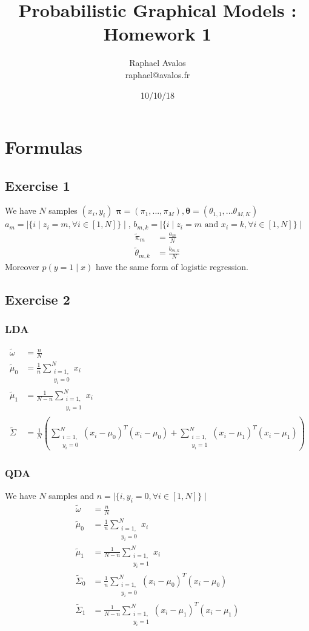 \documentclass[a4paper]{article}
\title{Probabilistic Graphical Models : Homework 1}
\author{Raphael Avalos\\raphael@avalos.fr}
\date{10/10/18}
\begin{document}
\maketitle
\section{Formulas}
\subsection{Exercise 1}
We have $N$ samples $(x_i,y_i)$
$\pmb{\pi} = (\pi_1, ..., \pi_M), \pmb{\theta} = (\theta_{1,1}, ... \theta_{M,K})$	\\
$a_m = \mid \{ i \mid  z_i = m, \forall i \in [1,N]\}\mid $, $b_{m,k} = \mid \{ i \mid  z_i = m \text{ and } x_i = k, \forall i \in [1,N]\}\mid $
\begin{align*}
\tilde{\pi}_m &= \frac{a_m}{N} \\
\tilde{\theta}_{m,k} &= \frac{b_{m,k}}{N}
\end{align*}
Moreover $p(y=1 \mid x)$ have the same form of logistic regression.
\subsection{Exercise 2}
\subsubsection{LDA}
\begin{align*}
\tilde{\omega} &= \frac{n}{N} \\
\tilde{\mu}_0 &= \frac{1}{n} \sum_{\substack{i=1,\\ y_i=0}}^N x_i \\
\tilde{\mu}_1 &= \frac{1}{N-n} \sum_{\substack{i=1,\\ y_i=1}}^N x_i \\
\tilde{\Sigma} &= \frac{1}{N}(\sum_{\substack{i=1,\\ y_i=0}}^N (x_i - \mu_0)^T(x_i - \mu_0) + \sum_{\substack{i=1,\\ y_i=1}}^N (x_i - \mu_1)^T(x_i - \mu_1))
\end{align*}
\subsubsection{QDA}
We have $N$ samples and $n=\mid \{i, y_i = 0, \forall i \in [1,N]\}\mid $
\begin{align*}
\tilde{\omega} &= \frac{n}{N} \\
\tilde{\mu}_0 &= \frac{1}{n} \sum_{\substack{i=1,\\ y_i=0}}^N x_i \\
\tilde{\mu}_1 &= \frac{1}{N-n} \sum_{\substack{i=1,\\ y_i=1}}^N x_i \\
\tilde{\Sigma}_0 &= \frac{1}{n} \sum_{\substack{i=1,\\ y_i=0}}^N (x_i - \mu_0)^T(x_i - \mu_0) \\
\tilde{\Sigma}_1 &= \frac{1}{N-n} \sum_{\substack{i=1,\\ y_i=1}}^N (x_i - \mu_1)^T(x_i - \mu_1)
\end{align*}
\newpage
\end{document}
